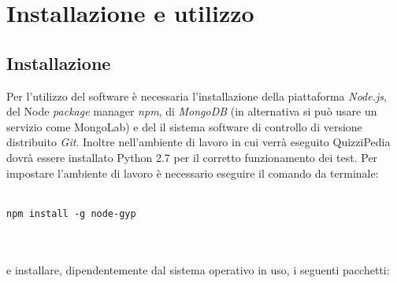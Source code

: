 \newpage
\section{Installazione e utilizzo}
\subsection{Installazione}
Per l'utilizzo del software è necessaria l'installazione della piattaforma \textit{Node.js}, del Node \textit{package} manager \textit{npm}, di \textit{MongoDB} (in alternativa si può usare un servizio come MongoLab) e del il sistema software di controllo di versione distribuito \textit{Git}. 
Inoltre nell'ambiente di lavoro in cui verrà eseguito QuizziPedia dovrà essere installato Python 2.7 per il corretto funzionamento dei test. Per impostare l'ambiente di lavoro è necessario eseguire il comando da terminale:\\
\\
\centerline{\texttt{npm install -g node-gyp}}\\
\\
e installare, dipendentemente dal sistema operativo in uso, i seguenti pacchetti:
